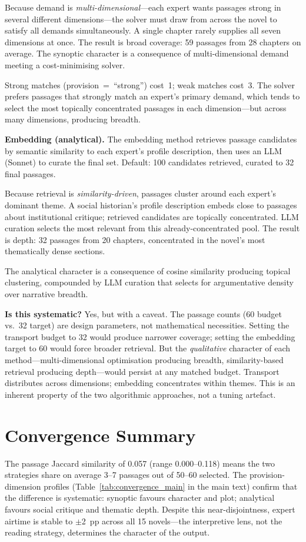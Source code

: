 \documentclass[letterpaper]{article}
\begin{document}
Because demand is \emph{multi-dimensional}---each expert wants
passages strong in several different dimensions---the solver must draw
from across the novel to satisfy all demands simultaneously.  A
single chapter rarely supplies all seven dimensions at once.  The
result is broad coverage: 59 passages from 28 chapters on average.
The synoptic character is a consequence of multi-dimensional demand
meeting a cost-minimising solver.

Strong matches (provision~=~``strong'') cost~1; weak matches cost~3.
The solver prefers passages that strongly match an expert's primary
demand, which tends to select the most topically concentrated passages
in each dimension---but across many dimensions, producing breadth.

\textbf{Embedding (analytical).}  The embedding method retrieves
passage candidates by semantic similarity to each expert's profile
description, then uses an LLM (Sonnet) to curate the final set.
Default: 100 candidates retrieved, curated to 32 final passages.

Because retrieval is \emph{similarity-driven}, passages cluster
around each expert's dominant theme.  A social historian's profile
description embeds close to passages about institutional critique;
retrieved candidates are topically concentrated.  LLM curation selects
the most relevant from this already-concentrated pool.  The result is
depth: 32 passages from 20 chapters, concentrated in the novel's most
thematically dense sections.

The analytical character is a consequence of cosine similarity
producing topical clustering, compounded by LLM curation that selects
for argumentative density over narrative breadth.

\textbf{Is this systematic?}  Yes, but with a caveat.  The passage
counts (60 budget vs.\ 32 target) are design parameters, not
mathematical necessities.  Setting the transport budget to 32 would
produce narrower coverage; setting the embedding target to 60 would
force broader retrieval.  But the \emph{qualitative} character of each
method---multi-dimensional optimisation producing breadth,
similarity-based retrieval producing depth---would persist at any
matched budget.  Transport distributes across dimensions; embedding
concentrates within themes.  This is an inherent property of the two
algorithmic approaches, not a tuning artefact.

\section{Convergence Summary}

The passage Jaccard similarity of 0.057 (range 0.000--0.118) means
the two strategies share on average 3--7 passages out of 50--60
selected.  The provision-dimension profiles
(Table~\ref{tab:convergence_main} in the main text) confirm that the
difference is systematic: synoptic favours character and plot;
analytical favours social critique and thematic depth.  Despite
this near-disjointness, expert airtime is stable to $\pm$2~pp across
all 15 novels---the interpretive lens, not the reading strategy,
determines the character of the output.
\end{document}
